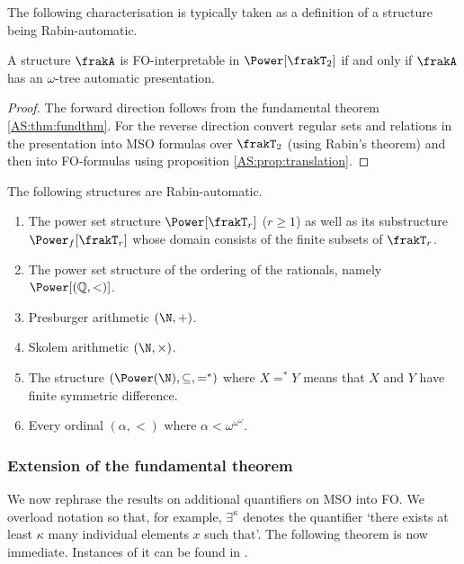 The following characterisation is typically taken as a definition of a structure being Rabin-automatic. 

\begin{proposition}
A structure $\frakA$ is FO-interpretable in $\Power[\frakT_2]$ if and only if $\frakA$ has an $\omega$-tree automatic presentation.
\end{proposition}

\begin{proof}
The forward direction follows from the fundamental theorem \ref{AS:thm:fundthm}. For the reverse direction convert regular sets and relations in the presentation
into MSO formulas over $\frakT_2$ (using Rabin's theorem) and then into FO-formulas using  proposition \ref{AS:prop:translation}.
\end{proof}

\begin{example}
 The following structures are Rabin-automatic.
\begin{enumerate}
 \item The power set structure $\Power[\frakT_r]$ ($r \geq 1$) as well as its substructure $\Power_f[\frakT_r]$ whose domain consists of the finite subsets of $\frakT_r$.
 \item The power set structure of the ordering of the rationals, namely $\Power[(\mathbb{Q},<)]$.
 \item Presburger arithmetic $(\N,+)$.
 \item Skolem arithmetic $(\N,\times)$.
 \item The structure $(\Power(\N),\subseteq, =^*)$ where $X =^* Y$ means that $X$ and $Y$ have finite symmetric difference.
 \item Every ordinal $(\alpha,<)$ where $\alpha < \omega^{\omega^\omega}$.
\end{enumerate}


\end{example}
\subsubsection*{Extension of the fundamental theorem}

We now rephrase the results on additional quantifiers on MSO into FO. We overload notation so that, for example, $\exists^\kappa$ denotes the quantifier `there exists at least $\kappa$ many individual elements $x$ such that'. The following theorem is now immediate. Instances of it can be found in \cite{BlGr00,KRS04,KuLo05}.


